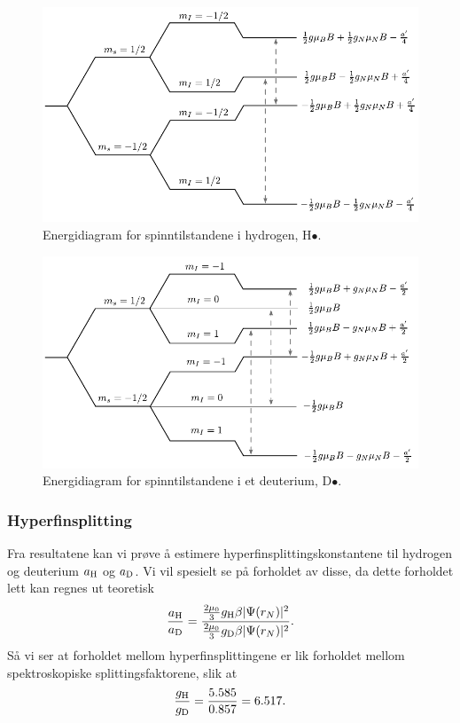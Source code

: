 \documentclass[a4paper, 11pt, notitlepage]{article}
\begin{document}
\begin{figure}[p]
\centering
\includegraphics[width=\textwidth]{fig_1.pdf}
\caption{Energidiagram for spinntilstandene i hydrogen, H$\bullet$.}
\end{figure}
\begin{figure}[p]
\centering
\includegraphics[width=\textwidth]{fig_2.pdf}
\caption{Energidiagram for spinntilstandene i et deuterium, D$\bullet$.}
\end{figure}


\subsubsection{Hyperfinsplitting}
Fra resultatene kan vi prøve å estimere hyperfinsplittingskonstantene til hydrogen og deuterium $a_{\rm H}$ og $a_{\rm D}$. Vi vil spesielt se på forholdet av disse, da dette forholdet lett kan regnes ut teoretisk
$$\frac{a_{\rm H}}{a_{\rm D}} = \frac{\frac{2\mu_0}{3} g_{\rm H} \beta |\Psi(r_N)|^2}{\frac{2\mu_0}{3}g_{\rm D} \beta |\Psi(r_N)|^2}.$$
Så vi ser at forholdet mellom hyperfinsplittingene er lik forholdet mellom spektroskopiske splittingsfaktorene, slik at
$$\frac{g_{\rm H}}{g_{\rm D}} = \frac{5.585}{0.857} = 6.517.$$
\end{document}
